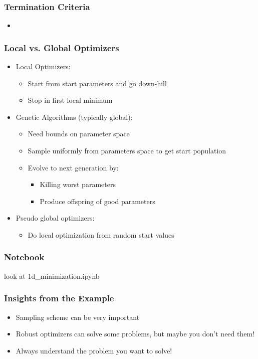 \documentclass[11pt]{beamer}
\begin{document}
\begin{frame}[c]\frametitle{Termination Criteria}
    \begin{itemize}
        \item
    \end{itemize}
\end{frame}


\begin{frame}[c]\frametitle{Local vs. Global Optimizers}
    \begin{itemize}
        \item Local Optimizers:
        \begin{itemize}
            \item Start from start parameters and go down-hill
            \item Stop in first local minimum
        \end{itemize}
        \item Genetic Algorithms (typically global):
        \begin{itemize}
            \item Need bounds on parameter space
            \item Sample uniformly from parameters space to get start population
            \item Evolve to next generation by:
            \begin{itemize}
                 \item Killing worst parameters
                 \item Produce offspring of good parameters
            \end{itemize}
        \end{itemize}
        \item Pseudo global optimizers:
        \begin{itemize}
            \item Do local optimization from random start values
        \end{itemize}
    \end{itemize}
\end{frame}



\begin{frame}[c]\frametitle{Notebook}
    look at 1d\_minimization.ipynb
\end{frame}


\begin{frame}[c]\frametitle{Insights from the Example}

    \begin{itemize}
        \item Sampling scheme can be very important
        \item Robust optimizers can solve some problems, but maybe you don't need them!
        \item Always understand the problem you want to solve!
    \end{itemize}

\end{frame}
\end{document}
